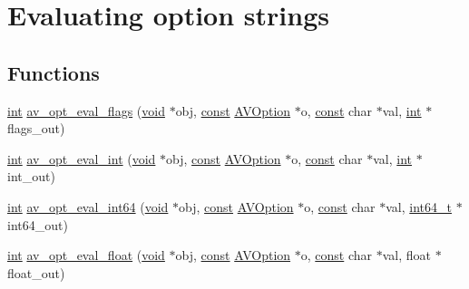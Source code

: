 \hypertarget{group__opt__eval__funcs}{}\section{Evaluating option strings}
\label{group__opt__eval__funcs}
\subsection*{Functions}
\begin{DoxyCompactItemize}
\item 
\hyperlink{xmltok_8h_a5a0d4a5641ce434f1d23533f2b2e6653}{int} \hyperlink{group__opt__eval__funcs_gae245940b870e13b759354d570decf3dc}{av\+\_\+opt\+\_\+eval\+\_\+flags} (\hyperlink{sound_8c_ae35f5844602719cf66324f4de2a658b3}{void} $\ast$obj, \hyperlink{getopt1_8c_a2c212835823e3c54a8ab6d95c652660e}{const} \hyperlink{struct_a_v_option}{A\+V\+Option} $\ast$o, \hyperlink{getopt1_8c_a2c212835823e3c54a8ab6d95c652660e}{const} char $\ast$val, \hyperlink{xmltok_8h_a5a0d4a5641ce434f1d23533f2b2e6653}{int} $\ast$flags\+\_\+out)
\item 
\hyperlink{xmltok_8h_a5a0d4a5641ce434f1d23533f2b2e6653}{int} \hyperlink{group__opt__eval__funcs_ga8bcee89d4a51400092e2d653c842bfa8}{av\+\_\+opt\+\_\+eval\+\_\+int} (\hyperlink{sound_8c_ae35f5844602719cf66324f4de2a658b3}{void} $\ast$obj, \hyperlink{getopt1_8c_a2c212835823e3c54a8ab6d95c652660e}{const} \hyperlink{struct_a_v_option}{A\+V\+Option} $\ast$o, \hyperlink{getopt1_8c_a2c212835823e3c54a8ab6d95c652660e}{const} char $\ast$val, \hyperlink{xmltok_8h_a5a0d4a5641ce434f1d23533f2b2e6653}{int} $\ast$int\+\_\+out)
\item 
\hyperlink{xmltok_8h_a5a0d4a5641ce434f1d23533f2b2e6653}{int} \hyperlink{group__opt__eval__funcs_gae2285d602e2079f0df141826fc00c666}{av\+\_\+opt\+\_\+eval\+\_\+int64} (\hyperlink{sound_8c_ae35f5844602719cf66324f4de2a658b3}{void} $\ast$obj, \hyperlink{getopt1_8c_a2c212835823e3c54a8ab6d95c652660e}{const} \hyperlink{struct_a_v_option}{A\+V\+Option} $\ast$o, \hyperlink{getopt1_8c_a2c212835823e3c54a8ab6d95c652660e}{const} char $\ast$val, \hyperlink{lib-src_2ffmpeg_2win32_2stdint_8h_a67a9885ef4908cb72ce26d75b694386c}{int64\+\_\+t} $\ast$int64\+\_\+out)
\item 
\hyperlink{xmltok_8h_a5a0d4a5641ce434f1d23533f2b2e6653}{int} \hyperlink{group__opt__eval__funcs_ga3c06cf2a2e7efc60d97adbeb7bbb6b44}{av\+\_\+opt\+\_\+eval\+\_\+float} (\hyperlink{sound_8c_ae35f5844602719cf66324f4de2a658b3}{void} $\ast$obj, \hyperlink{getopt1_8c_a2c212835823e3c54a8ab6d95c652660e}{const} \hyperlink{struct_a_v_option}{A\+V\+Option} $\ast$o, \hyperlink{getopt1_8c_a2c212835823e3c54a8ab6d95c652660e}{const} char $\ast$val, float $\ast$float\+\_\+out)

\end{DoxyCompactItemize}

